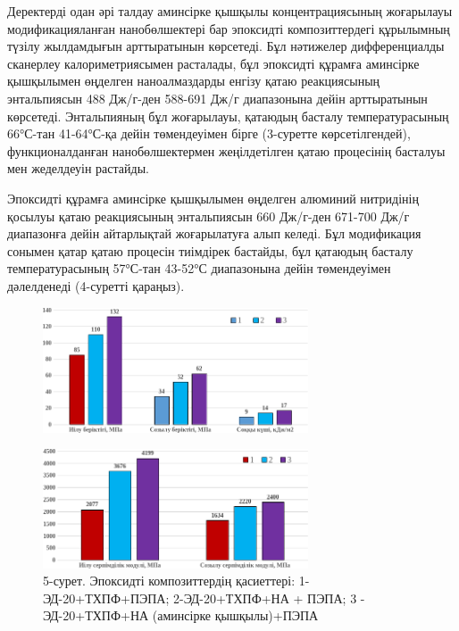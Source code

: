 \begin{multicols}{2}
Деректерді одан әрі талдау аминсірке қышқылы концентрациясының
жоғарылауы модификацияланған нанобөлшектері бар эпоксидті
композиттердегі құрылымның түзілу жылдамдығын арттыратынын көрсетеді.
Бұл нәтижелер дифференциалды сканерлеу калориметриясымен расталады, бұл
эпоксидті құрамға аминсірке қышқылымен өңделген наноалмаздарды енгізу
қатаю реакциясының энтальпиясын 488 Дж/г-ден 588-691 Дж/г диапазонына
дейін арттыратынын көрсетеді. Энтальпияның бұл жоғарылауы, қатаюдың
басталу температурасының 66°С-тан 41-64°С-қа дейін төмендеуімен бірге
(3-суретте көрсетілгендей), функционалданған нанобөлшектермен
жеңілдетілген қатаю процесінің басталуы мен жеделдеуін растайды.

Эпоксидті құрамға аминсірке қышқылымен өңделген алюминий нитридінің
қосылуы қатаю реакциясының энтальпиясын 660 Дж/г-ден 671-700 Дж/г
диапазонға дейін айтарлықтай жоғарылатуға алып келеді. Бұл модификация
сонымен қатар қатаю процесін тиімдірек бастайды, бұл қатаюдың басталу
температурасының 57°С-тан 43-52°С диапазонына дейін төмендеуімен
дәлелденеді (4-суретті қараңыз).
\end{multicols}

\begin{figure}[H]
	\centering
	\includegraphics[width=0.7\textwidth]{media/chem/image109}
\end{figure}
\begin{figure}[H]
	\centering
	\includegraphics[width=0.7\textwidth]{media/chem/image110}
    \caption*{5-сурет. Эпоксидті композиттердің қасиеттері: 1-ЭД-20+ТХПФ+ПЭПА;
2-ЭД-20+ТХПФ+НА + ПЭПА; 3 - ЭД-20+ТХПФ+НА (аминсірке қышқылы)+ПЭПА}
\end{figure}

